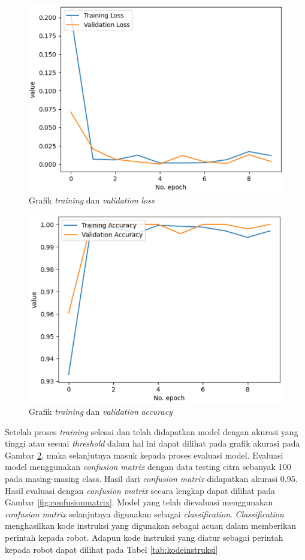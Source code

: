 \begin{figure}[H]
  \centering
  \includegraphics[width=0.7\linewidth]{../Gambar/loss.png}
  \caption{Grafik \emph{training} dan \emph{validation} \emph{loss}}
  \label{fig:loss}
\end{figure}

\begin{figure}[H]
  \centering
  \includegraphics[width=0.7\linewidth]{../Gambar/akurasi.png}
  \caption{Grafik \emph{training} dan \emph{validation} \emph{accuracy}}
  \label{fig:akurasi}
\end{figure}

Setelah proses \emph{training} selesai dan telah didapatkan model dengan akurasi yang tinggi atau sesuai \emph{threshold} dalam hal ini dapat dilihat pada grafik akurasi pada Gambar \ref{fig:akurasi}, maka selanjutnya masuk kepada proses evaluasi model. Evaluasi model menggunakan \emph{confusion matrix} dengan data testing citra sebanyak 100 pada masing-masing class. Hasil dari \emph{confusion matrix} didapatkan akurasi 0.95. Hasil evaluasi dengan \emph{confusion matrix} secara lengkap dapat dilihat pada Gambar \ref{fig:confusionmatrix}. Model yang telah dievaluasi menggunakan \emph{confusion matrix} selanjutnya digunakan sebagai \emph{classification}. \emph{Classification} menghasilkan kode instruksi yang digunakan sebagai acuan dalam memberikan perintah kepada robot. Adapun kode instruksi yang diatur sebagai perintah kepada robot dapat dilihat pada Tabel \ref{tab:kodeinstruksi}

